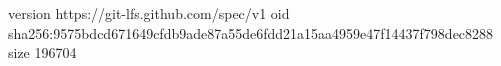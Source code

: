 version https://git-lfs.github.com/spec/v1
oid sha256:9575bdcd671649cfdb9ade87a55de6fdd21a15aa4959e47f14437f798dec8288
size 196704

